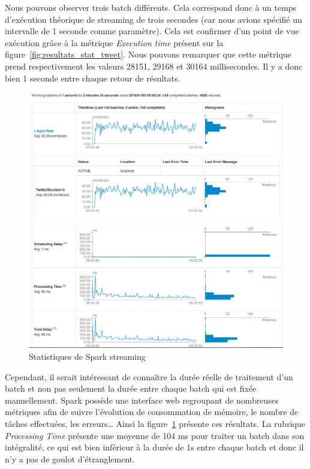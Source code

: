     Nous pouvons observer trois batch différents. Cela correspond donc à un temps d'exécution théorique de streaming de trois secondes (car nous avions spécifié un intervalle de 1 seconde comme paramètre). Cela est confirmer d'un point de vue exécution grâce à la métrique \emph{Execution time} présent sur la figure~\ref{fig:resultats_stat_tweet}. Nous pouvons remarquer que cette métrique prend respectivement les valeurs 28151, 29168 et 30164 millisecondes. Il y a donc bien 1 seconde entre chaque retour de résultats. \\

    \begin{figure}
      \centering
      \includegraphics[width=1.0\textwidth]{images/streaming_spark_ui.png}
      \caption{Statistiques de Spark streaming}
      \label{fig:statistiques_spark_streaming_ui}
    \end{figure}

    Cependant, il serait intéressant de connaître la durée réelle de traitement d'un batch et non pas seulement la durée entre chaque batch qui est fixée manuellement. Spark possède une interface web regroupant de nombreuses métriques afin de suivre l'évolution de consommation de mémoire, le nombre de tâches effectuées, les erreurs… Ainsi la figure~\ref{fig:statistiques_spark_streaming_ui} présente ces résultats. La rubrique \emph{Processing Time} présente une moyenne de 104 ms pour traiter un batch dans son intégralité, ce qui est bien inférieur à la durée de 1s entre chaque batch et donc il n'y a pas de goulot d'étranglement. \\

